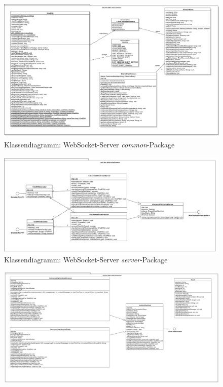 \documentclass[11pt,a4paper,titlepage]{scrartcl}
\numberwithin{equation}{section}
\begin{document}
\begin{landscape}
\begin{figure}[ht] 
	\begin{center}
		\includegraphics[scale=0.45]{img/pkgCommon.pdf}
		\caption[]{Klassendiagramm: WebSocket-Server \textit{common}-Package}
		\label{fig:kdcommon}
	\end{center}
\end{figure}
\begin{figure}[ht] 
	\begin{center}
		\includegraphics[scale=0.5]{img/pkgServer.pdf}
		\caption[]{Klassendiagramm: WebSocket-Server \textit{server}-Package}
		\label{fig:kdserver}
	\end{center}
\end{figure}
\begin{figure}[ht] 
	\begin{center}
		\includegraphics[scale=0.4]{img/Bench.pdf}

\end{center}
\end{figure}
\end{landscape}
\end{document}
